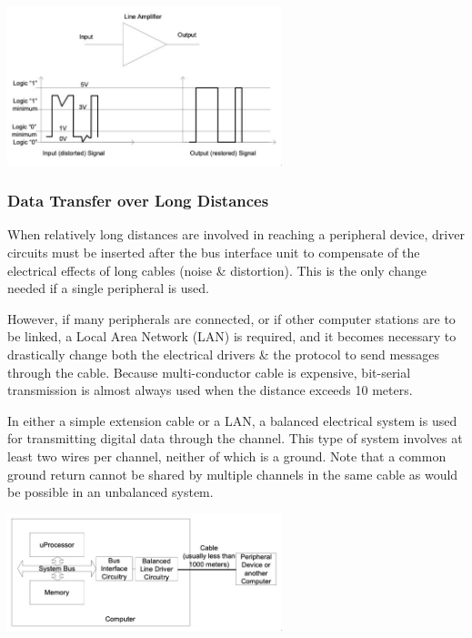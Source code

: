 \documentclass[11pt]{article}
\begin{document}
\begin{center}
    \includegraphics[width=0.6\textwidth]{noisecomp.png}
\end{center}

\subsubsection{Data Transfer over Long Distances} 
When relatively long distances are involved in reaching a peripheral device, driver circuits must be inserted after the bus 
interface unit to compensate of the electrical effects of long cables (noise \& distortion). 
This is the only change needed if a single peripheral is used. 

However, if many peripherals are connected, or if other computer stations are to be linked, a Local Area Network (LAN) is 
required, and it becomes necessary to drastically change both the electrical drivers \& the protocol to send messages through the 
cable. 
Because multi-conductor cable is expensive, bit-serial transmission is almost always used when the distance exceeds 10 meters. 

In either a simple extension cable or a LAN, a balanced electrical system is used for transmitting digital data through the channel. 
This type of system involves at least two wires per channel, neither of which is a ground. 
Note that a common ground return cannot be shared by multiple channels in the same cable as would be possible in an unbalanced system. 

\begin{center}
    \includegraphics[width=0.6\textwidth]{dtold.png}
\end{center}
\end{document}
